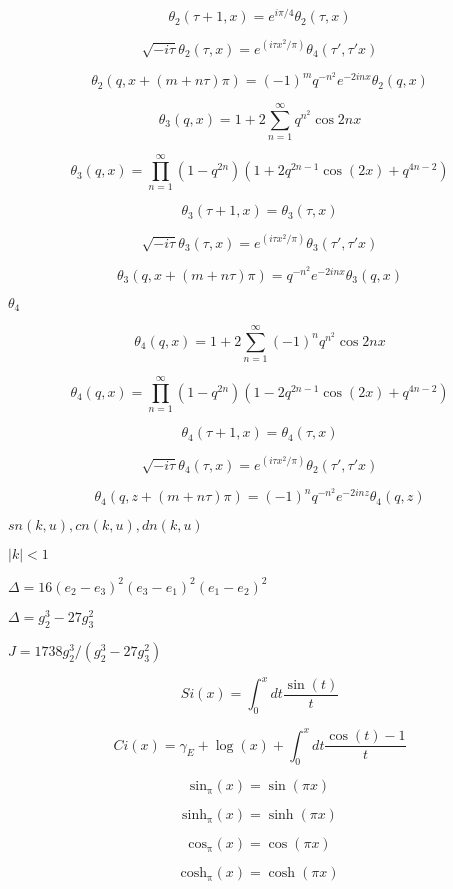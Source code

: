 \documentclass{article}
\begin{document}
\[ \theta_2(\tau+1,x) = e^{i\pi/4}\theta_2(\tau,x) \]
\pagebreak

\[ \sqrt{-i\tau}\theta_2(\tau,x) = e^{(i\tau x^2/\pi)}\theta_4(\tau',\tau' x) \]
\pagebreak

\[ \theta_2(q, x + (m+n\tau)\pi) = (-1)^{m}q^{-n^2}e^{-2inx}\theta_2(q, x) \]
\pagebreak

\[ \theta_3(q,x) = 1 + 2\sum_{n=1}^{\infty} q^{n^2}\cos{2nx} \]
\pagebreak

\[ \theta_3(q,x) = \prod_{n=1}^{\infty} (1 - q^{2n})(1 + 2q^{2n-1}\cos(2x) + q^{4n-2}) \]
\pagebreak

\[ \theta_3(\tau+1,x) = \theta_3(\tau,x) \]
\pagebreak

\[ \sqrt{-i\tau}\theta_3(\tau,x) = e^{(i\tau x^2/\pi)}\theta_3(\tau',\tau' x) \]
\pagebreak

\[ \theta_3(q, x + (m+n\tau)\pi) = q^{-n^2} e^{-2inx} \theta_3(q, x) \]
\pagebreak

$ \theta_4 $
\pagebreak

\[ \theta_4(q,x) = 1 + 2\sum_{n=1}^{\infty}(-1)^n q^{n^2}\cos{2nx} \]
\pagebreak

\[ \theta_4(q,x) = \prod_{n=1}^{\infty} (1 - q^{2n})(1 - 2q^{2n-1}\cos(2x) + q^{4n-2}) \]
\pagebreak

\[ \theta_4(\tau+1,x) = \theta_4(\tau,x) \]
\pagebreak

\[ \sqrt{-i\tau}\theta_4(\tau,x) = e^{(i\tau x^2/\pi)}\theta_2(\tau',\tau' x) \]
\pagebreak

\[ \theta_4(q, z+(m + n\tau)\pi) = (-1)^n q^{-n^2}e^{-2inz}\theta_4(q, z) \]
\pagebreak

$ sn(k, u), cn(k, u), dn(k, u) $
\pagebreak

$ |k| < 1 $
\pagebreak

$ \Delta = 16(e_2 - e_3)^2(e_3 - e_1)^2(e_1 - e_2)^2 $
\pagebreak

$ \Delta = g_2^3 - 27 g_3^2 $
\pagebreak

$ J = 1738 g_2^3 / (g_2^3 - 27 g_3^2) $
\pagebreak

\[ Si(x) = \int_0^x dt \frac{\sin(t)}{t} \]
\pagebreak

\[ Ci(x) = \gamma_E + \log(x) + \int_0^x dt \frac{\cos(t) - 1}{t} \]
\pagebreak

\[ \mathrm{sin_\pi}(x) = \sin(\pi x) \]
\pagebreak

\[ \mathrm{sinh_\pi}(x) = \sinh(\pi x) \]
\pagebreak

\[ \mathrm{cos_\pi}(x) = \cos(\pi x) \]
\pagebreak

\[ \mathrm{cosh_\pi}(x) = \cosh(\pi x) \]
\pagebreak
\end{document}
